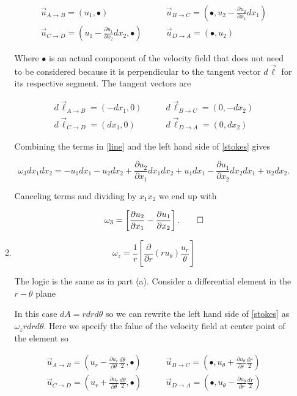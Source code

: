 \documentclass[11pt,twoside]{article}
\newcommand{\p}[2]{\frac{\partial#1}{\partial#2}}
\newcommand{\vect}[1]{\vec{#1}}
\begin{document}
\begin{enumerate}
\begin{enumerate}
\begin{align*}
\vect{u}_{A\rightarrow B} = (u_1, \bullet)\quad&\quad\vect{u}_{B\rightarrow C} = (\bullet, u_2-\p{u_2}{x_1}dx_1)\\
\vect{u}_{C\rightarrow D} = (u_1-\p{u_1}{x_2}dx_2, \bullet) \quad&\quad\vect{u}_{D\rightarrow A} = (\bullet,u_2)
\end{align*}

Where $\bullet$ is an actual component of the velocity field that does not need to be considered because it is perpendicular to the tangent vector $d\vect{\ell}$ for its respective segment. The tangent vectors are

\begin{align*}
d\vect{\ell}_{A\rightarrow B} = (-dx_1, 0)\quad&\quad d\vect{\ell}_{B\rightarrow C} = (0, -dx_2)\\
d\vect{\ell}_{C\rightarrow D} = (dx_1,0) \quad&\quad d\vect{\ell}_{D\rightarrow A} = (0,dx_2)
\end{align*}

Combining the terms in \autoref{line} and the left hand side of \autoref{stokes} gives

$$\omega_3dx_1dx_2 = -u_1dx_1 - u_2dx_2 + \p{u_2}{x_1}dx_1dx_2 +  u_1dx_1-\p{u_1}{x_2}dx_2dx_1 + u_2dx_2.$$

Canceling terms and dividing by $x_1x_2$ we end up with

$$\omega_3 =  \left[\p{u_2}{x_1}-\p{u_1}{x_2}\right].\qed$$
	
\item	

$$\omega_z=\frac{1}{r}\left[\p{}{r}(ru_\theta)\frac{u_r}{\theta}\right]$$


The logic is the same as in part (a). Consider a differential element in the $r-\theta$ plane



In this case $dA=rdrd\theta$ so we can rewrite the left hand side of \autoref{stokes} as $\omega_zrdrd\theta$.  Here we specify the falue of the velocity field at center point of the element so 

\begin{align*}
\vect{u}_{A\rightarrow B} = \left(u_r-\p{u_r}{\theta}\frac{d\theta}{2}, \bullet\right)\quad&\quad\vect{u}_{B\rightarrow C} = \left(\bullet, u_\theta+\p{u_\theta}{r}\frac{dr}{2}\right)\\
\vect{u}_{C\rightarrow D} = \left(u_r+\p{u_r}{\theta}\frac{d\theta}{2}, \bullet\right) \quad&\quad\vect{u}_{D\rightarrow A} = \left(\bullet,u_\theta-\p{u_\theta}{r}\frac{dr}{2}\right)
\end{align*}


\end{enumerate}
\end{enumerate}
\end{document}

